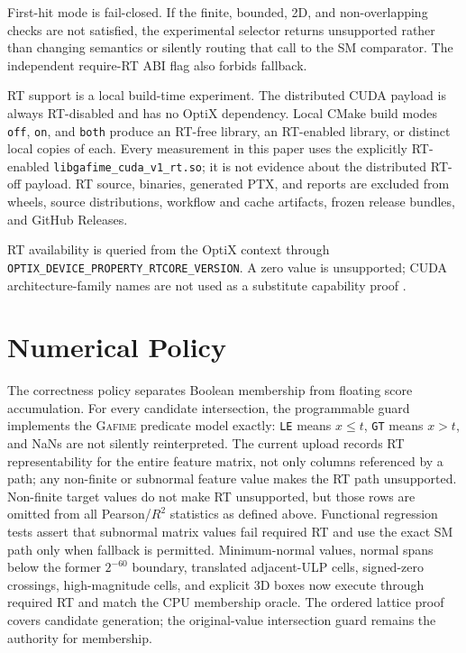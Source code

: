 \documentclass[11pt]{article}
\newcommand{\gafime}{\textsc{Gafime}\xspace}
\begin{document}
First-hit mode is fail-closed. If the finite, bounded, 2D, and non-overlapping
checks are not satisfied, the experimental selector
returns unsupported rather than changing semantics or silently routing that
call to the SM comparator. The independent require-RT ABI flag also forbids
fallback.

RT support is a local build-time experiment. The distributed CUDA payload is
always RT-disabled and has no OptiX dependency. Local CMake build modes
\texttt{off}, \texttt{on}, and \texttt{both} produce an RT-free library, an
RT-enabled library, or distinct local copies of each. Every measurement in this
paper uses the explicitly RT-enabled
\texttt{libgafime\_cuda\_v1\_rt.so}; it is not evidence about the distributed
RT-off payload. RT source, binaries, generated PTX, and reports are excluded
from wheels, source distributions, workflow and cache artifacts, frozen release
bundles, and GitHub Releases.

RT availability is queried from the OptiX context through
\nolinkurl{OPTIX_DEVICE_PROPERTY_RTCORE_VERSION}. A zero value is unsupported;
CUDA architecture-family names are not used as a substitute capability proof
\cite{nvidiaoptix9}.

\section{Numerical Policy}

The correctness policy separates Boolean membership from floating score
accumulation. For every candidate intersection, the programmable guard
implements the \gafime predicate model exactly: \texttt{LE} means $x \le t$,
\texttt{GT} means $x > t$, and NaNs are not silently reinterpreted. The current
upload records RT representability for the entire feature matrix, not only
columns referenced by a path; any non-finite or subnormal feature value makes
the RT path unsupported. Non-finite target values do not make RT unsupported, but those
rows are omitted from all Pearson/$R^2$ statistics as defined above. Functional
regression tests assert that subnormal matrix values fail required RT and use
the exact SM path only when fallback is permitted. Minimum-normal values,
normal spans below the former $2^{-60}$ boundary, translated adjacent-ULP
cells, signed-zero crossings, high-magnitude cells, and explicit 3D boxes now
execute through required RT and match the CPU membership oracle. The ordered
lattice proof covers candidate generation; the original-value intersection
guard remains the authority for membership.
\end{document}
